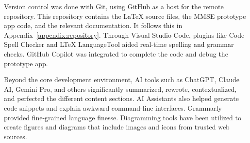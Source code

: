 Version control was done with Git, using GitHub as a host for the remote repository. This repository contains the \LaTeX{} source files, the MMSE prototype app code, and the relevant documentation. It follows this in Appendix~\ref{appendix:repository}. Through Visual Studio Code, plugins like Code Spell Checker and LTeX LanguageTool aided real-time spelling and grammar checks. GitHub Copilot was integrated to complete the code and debug the prototype app.

Beyond the core development environment, AI tools such as ChatGPT, Claude AI, Gemini Pro, and others significantly summarized, rewrote, contextualized, and perfected the different content sections. AI Assistants also helped generate code snippets and explain awkward command-line interfaces. Grammarly provided fine-grained language finesse. Diagramming tools have been utilized to create figures and diagrams that include images and icons from trusted web sources.
